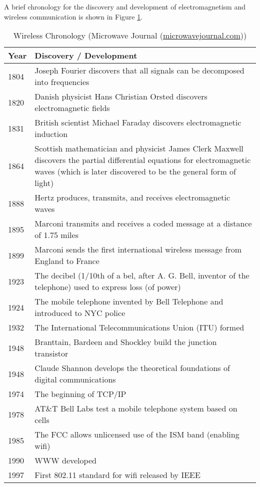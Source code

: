 A brief chronology for the discovery and development of electromagnetism and wireless
communication is shown in Figure \ref{chronology}.
\begin{table}
\begin{tabular}{|l|p{12cm}|}
\hline
\bf Year & \bf Discovery / Development \\
\hline
1804 & Joseph Fourier discovers that all signals can be decomposed into frequencies \\
1820 & Danish physicist Hans Christian Orsted discovers electromagnetic fields \\
1831 & British scientist Michael Faraday discovers electromagnetic induction \\
1864 & Scottish mathematician and physicist James Clerk Maxwell discovers the partial differential equations for electromagnetic waves
	(which is later discovered to be the general form of light)\\
1888 & Hertz produces, transmits, and receives electromagnetic waves \\
1895 & Marconi transmits and receives a coded message at a distance of 1.75 miles \\
1899 & Marconi sends the first international wireless message from England to France\\
1923 & The decibel (1/10th of a bel, after A. G. Bell, inventor of the telephone) used to express loss (of power) \\
1924 & The mobile telephone invented by Bell Telephone and introduced to NYC police \\
1932 & The International Telecommunications Union (ITU) formed \\
1948 & Branttain, Bardeen and Shockley build the junction transistor\\
1948 & Claude Shannon develops the theoretical foundations of digital communications \\
1974 & The beginning of TCP/IP\\
1978 & AT\&T Bell Labs test a mobile telephone system based on cells\\
1985 & The FCC allows unlicensed use of the ISM band (enabling wifi) \\
1990 & WWW developed\\
1997 & First 802.11 standard for wifi released by IEEE \\
\hline
\end{tabular}
	\caption{Wireless Chronology (Microwave Journal (\url{microwavejournal.com}))}\label{chronology}
\end{table}

